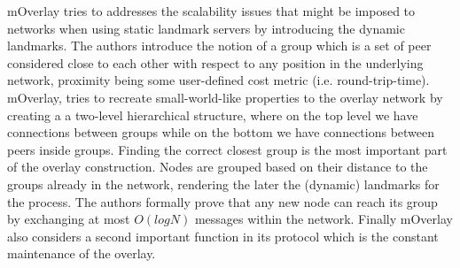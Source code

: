 \documentclass[acmcsur,acmnow]{acmtrans2m}
\begin{document}
mOverlay \cite{zhang_moverlay_2004} tries to addresses the scalability issues that might be imposed to networks when using static landmark servers by introducing the dynamic landmarks. The authors introduce the notion of a group which is a set of  peer considered close to each other with respect to any  position in the underlying network, proximity being some  user-defined cost metric (i.e. round-trip-time). mOverlay, tries to recreate small-world-like properties to the overlay network by creating a a two-level hierarchical structure, where on the top level we have connections between groups while on the bottom we have connections between peers inside groups. Finding the correct closest group is the most important part  of the overlay construction. Nodes are grouped based on their  distance to the groups already in the network, rendering the  later the (dynamic) landmarks for the process. The authors formally prove that any new node can reach its group by exchanging at most $O(logN)$ messages within the network. Finally mOverlay also considers a second important function in its protocol which is the constant maintenance of the overlay.

\renewcommand\arraystretch{1.4}%
\end{document}
